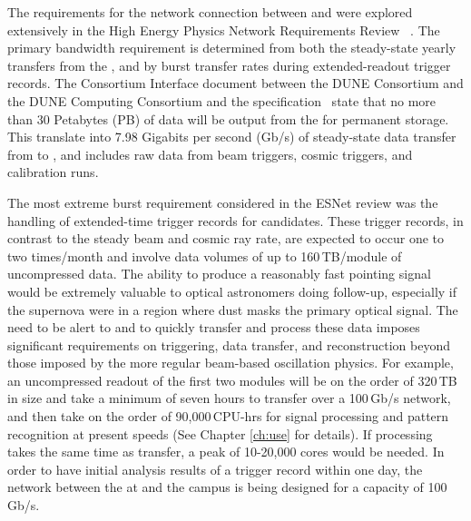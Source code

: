 \documentclass[../main-v1.tex]{subfiles}
\begin{document}
The requirements for the network connection between  and  were explored extensively in the High Energy Physics Network Requirements Review~\cite{bib:osti_1804717} . The primary bandwidth requirement is determined from both the steady-state yearly transfers from the , and by burst 
transfer rates during extended-readout trigger records. The Consortium Interface document between the DUNE  Consortium and the DUNE Computing Consortium and the  specification~\cite{edms:dunedaq} state that no more than 30 Petabytes (PB) of data will be output from the  for permanent storage. This translate into 7.98 Gigabits per second (Gb/s) of steady-state data transfer from  to , and includes raw data from beam triggers, cosmic triggers, and calibration runs. 

The most extreme burst requirement considered in the ESNet review was the handling of extended-time trigger records for %
 candidates. These trigger records, in contrast to the steady beam and cosmic ray rate,
are expected to occur one to two times/month and involve data volumes of up to 160\,TB/module of uncompressed  data. The ability to produce a reasonably fast pointing signal would be extremely valuable to optical astronomers doing follow-up, especially if the supernova were in a region where dust masks the primary optical signal. The need to be alert to %
 and to quickly transfer and process these data imposes significant requirements on triggering, data transfer, and reconstruction beyond those imposed by the more regular beam-based oscillation physics. For example, an uncompressed  readout of the first two  modules will be on the order of 320\,TB in size and take a minimum of seven hours to transfer over a 100\,Gb/s network, and then take on the order of 90,000\,CPU-hrs for signal processing and pattern recognition at present speeds (See Chapter \ref{ch:use} for details). If processing takes the same time as transfer, a peak of 10-20,000 cores would be needed. In order to have initial analysis results of a  trigger record within one day, the network between the   at  and the  campus is being designed for a capacity of 100\,Gb/s.  

\end{document}
